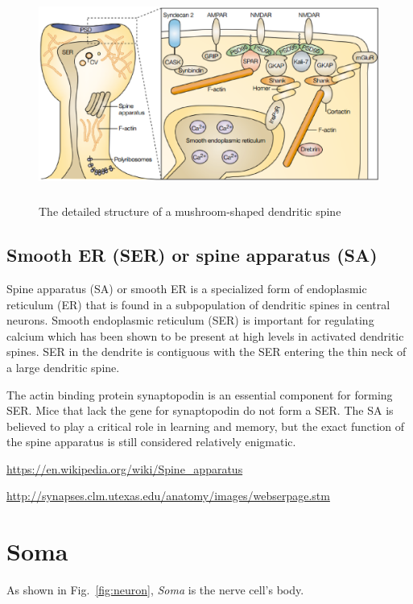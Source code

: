 \begin{figure}[htb]
\centerline{\includegraphics[height=7cm]{./images/dendritic_spine_mushroom.eps}}
\caption{The detailed structure of a mushroom-shaped dendritic spine}
\label{fig:dendritic_spines_mushroom}
\end{figure} 



\subsection{Smooth ER (SER) or spine apparatus (SA)}
\label{sec:Smooth-ER}

Spine apparatus (SA) or smooth ER is a specialized form of endoplasmic reticulum
(ER) that is found in a subpopulation of dendritic spines in central neurons.
Smooth endoplasmic reticulum (SER) is important for regulating calcium which has
been shown to be present at high levels in activated dendritic spines.
SER in the dendrite is contiguous with the SER entering the thin neck of a large
dendritic spine.

The actin binding protein synaptopodin is an essential component for forming
SER.
Mice that lack the gene for synaptopodin do not form a SER.
The SA is believed to play a critical role in learning and memory, but the exact
function of the spine apparatus is still considered relatively enigmatic.

\url{https://en.wikipedia.org/wiki/Spine_apparatus}

\url{http://synapses.clm.utexas.edu/anatomy/images/webserpage.stm} 
\section{Soma}
\label{sec:Soma}

As shown in Fig.~\ref{fig:neuron}, {\it Soma} is the nerve cell's body.

